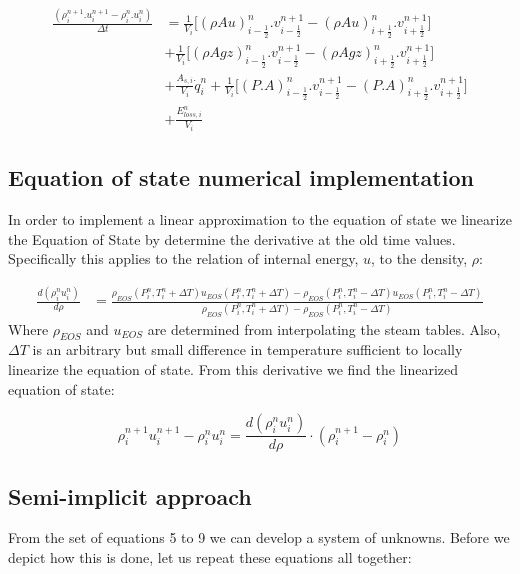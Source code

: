 \documentclass[11pt,letterpaper,titlepage]{article}
\newcommand{\half}{\frac{1}{2}}
\begin{document}
\begin{equation}
\begin{aligned}
\frac{(\rho_i^{n+1}.u_i^{n+1}-  \rho_i^{n}.u_i^{n})}{\Delta t}&=\frac{1}{V_i}\biggr[ (\rho Au)_{i-\half}^n.v_{i-\half}^{n+1} -(\rho Au)_{i+\half}^n.v_{i+\half}^{n+1} \biggr] \\
&+\frac{1}{V_i}\biggr[ (\rho Agz)_{i-\half}^n.v_{i-\half}^{n+1} -(\rho Agz)_{i+\half}^n.v_{i+\half}^{n+1} \biggr] \\
&+\frac{A_{s,i}}{V_i}\dot{q}_i^n + \frac{1}{V_i}\biggr[   (P.A)_{i-\half}^n.v_{i-\half}^{n+1} - (P.A)_{i+\half}^n.v_{i+\half}^{n+1}   \biggr] \\
&+ \frac{E_{loss,i}^n}{V_i}
\end{aligned}
\end{equation}


\newpage
\subsection{Equation of state numerical implementation}
In order to implement a linear approximation to the equation of state we linearize the Equation of State by determine the derivative at the old time values. Specifically this applies to the relation of internal energy, $u$, to the density, $\rho$:

\begin{equation*}
\begin{aligned}
\frac{d(\rho_i^n u_i^{n})}{d\rho}&=\frac{\rho_{EOS}(P_i^n,T_i^n+\Delta T) u_{EOS}(P_i^n,T_i^n+\Delta T)-\rho_{EOS}(P_i^n,T_i^n-\Delta T) u_{EOS}(P_i^n,T_i^n-\Delta T)}{\rho_{EOS}(P_i^n,T_i^n+\Delta T)-\rho_{EOS}(P_i^n,T_i^n-\Delta T)} 
\end{aligned}
\end{equation*}
\newline
Where $\rho_{EOS}$ and $u_{EOS}$ are determined from interpolating the steam tables. Also, $\Delta T$ is an arbitrary but small difference in temperature sufficient to locally linearize the equation of state.
From this derivative we find the linearized equation of state:

\begin{equation}
\rho_{i}^{n+1}u_{i}^{n+1} - \rho_{i}^{n}u_{i}^{n}= \frac{d(\rho_i^n u_i^{n})}{d\rho} \cdot (\rho_i^{n+1}-\rho_i^n)
\end{equation}







\newpage
\subsection{Semi-implicit approach}
From the set of equations 5 to 9 we can develop a system of unknowns. Before we depict how this is done, let us repeat these equations all together:
\end{document}
